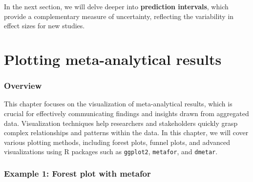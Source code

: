 \documentclass[
]{book}
\begin{document}
In the next section, we will delve deeper into \textbf{prediction intervals}, which provide a complementary measure of uncertainty, reflecting the variability in effect sizes for new studies.

\chapter{Plotting meta-analytical results}\label{plotting-meta-analytical-results}

\subsection{Overview}\label{overview-1}

This chapter focuses on the visualization of meta-analytical results, which is crucial for effectively communicating findings and insights drawn from aggregated data. Visualization techniques help researchers and stakeholders quickly grasp complex relationships and patterns within the data. In this chapter, we will cover various plotting methods, including forest plots, funnel plots, and advanced visualizations using R packages such as \texttt{ggplot2}, \texttt{metafor}, and \texttt{dmetar}.

\subsection{Example 1: Forest plot with metafor}\label{example-1-forest-plot-with-metafor}
\end{document}

